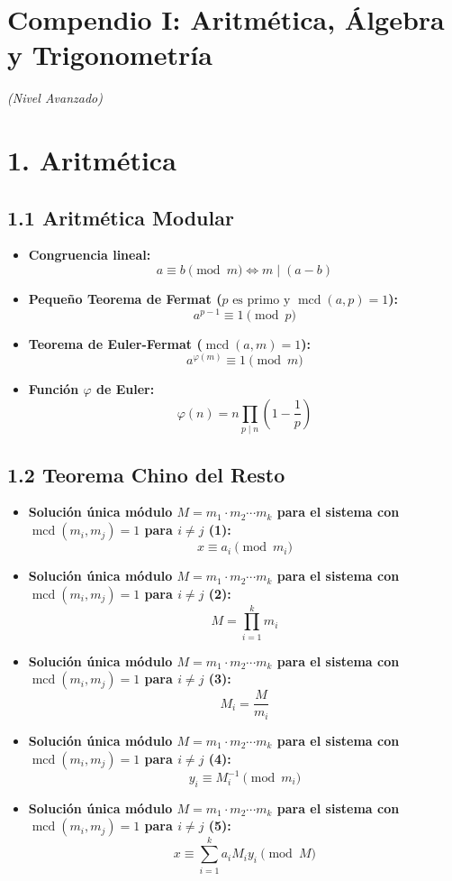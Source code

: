\documentclass[11pt,a4paper]{article}
\begin{document}
\section*{Compendio I: Aritmética, Álgebra y Trigonometría}

\textit{(Nivel Avanzado)}

\section*{1. Aritmética}

\subsection*{1.1 Aritmética Modular}

\begin{itemize}
  \item \textbf{Congruencia lineal:}
  \[
    a \equiv b \pmod{m} \iff m \mid (a - b)
  \]
  \item \textbf{Pequeño Teorema de Fermat ($p \text{ es primo y } \operatorname{mcd}(a, p) = 1$):}
  \[
    a^{p - 1} \equiv 1 \pmod{p}
  \]
  \item \textbf{Teorema de Euler-Fermat ($\operatorname{mcd}(a, m) = 1$):}
  \[
    a^{\varphi(m)} \equiv 1 \pmod{m}
  \]
  \item \textbf{Función $\varphi$ de Euler:}
  \[
    \varphi(n) = n \prod_{p \mid n} \left(1 - \frac{1}{p}\right)
  \]
\end{itemize}

\subsection*{1.2 Teorema Chino del Resto}

\begin{itemize}
  \item \textbf{Solución única módulo $M = m_1 \cdot m_2 \cdots m_k$ para el sistema con $\operatorname{mcd}(m_i, m_j) = 1$ para $i \ne j$ (1):}
  \[
    x \equiv a_i \pmod{m_i}
  \]
  \item \textbf{Solución única módulo $M = m_1 \cdot m_2 \cdots m_k$ para el sistema con $\operatorname{mcd}(m_i, m_j) = 1$ para $i \ne j$ (2):}
  \[
    M = \prod_{i=1}^k m_i
  \]
  \item \textbf{Solución única módulo $M = m_1 \cdot m_2 \cdots m_k$ para el sistema con $\operatorname{mcd}(m_i, m_j) = 1$ para $i \ne j$ (3):}
  \[
    M_i = \frac{M}{m_i}
  \]
  \item \textbf{Solución única módulo $M = m_1 \cdot m_2 \cdots m_k$ para el sistema con $\operatorname{mcd}(m_i, m_j) = 1$ para $i \ne j$ (4):}
  \[
    y_i \equiv M_i^{-1} \pmod{m_i}
  \]
  \item \textbf{Solución única módulo $M = m_1 \cdot m_2 \cdots m_k$ para el sistema con $\operatorname{mcd}(m_i, m_j) = 1$ para $i \ne j$ (5):}
  \[
    x \equiv \sum_{i=1}^k a_i M_i y_i \pmod{M}
  \]
\end{itemize}
\end{document}
